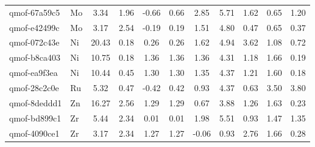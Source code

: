 \begin{table}[t]
\begin{tabular}{llccccccccc}
qmof-67a59c5 & Mo & 3.34 & 1.96 & -0.66 & 0.66 & 2.85 & 5.71 & 1.62 & 0.65 & 1.20 \\
qmof-e42499c & Mo & 3.17 & 2.54 & -0.19 & 0.19 & 1.51 & 4.80 & 0.47 & 0.65 & 0.37 \\
qmof-072c43e & Ni & 20.43 & 0.18 & 0.26 & 0.26 & 1.62 & 4.94 & 3.62 & 1.08 & 0.72 \\
qmof-b8ca403 & Ni & 10.75 & 0.18 & 1.36 & 1.36 & 1.36 & 4.31 & 1.18 & 1.66 & 0.19 \\
qmof-ea9f3ea & Ni & 10.44 & 0.45 & 1.30 & 1.30 & 1.35 & 4.37 & 1.21 & 1.60 & 0.18 \\
qmof-28c2c0e & Ru & 5.32 & 0.47 & -0.42 & 0.42 & 0.93 & 4.37 & 0.63 & 3.50 & 3.80 \\
qmof-8deddd1 & Zn & 16.27 & 2.56 & 1.29 & 1.29 & 0.67 & 3.88 & 1.26 & 1.63 & 0.23 \\
qmof-bd899c1 & Zr & 5.44 & 2.34 & 0.01 & 0.01 & 1.98 & 5.51 & 0.93 & 1.47 & 1.35 \\
qmof-4090ce1 & Zr & 3.17 & 2.34 & 1.27 & 1.27 & -0.06 & 0.93 & 2.76 & 1.66 & 0.28 \\
\hline\hline
\end{tabular}
\end{table}
